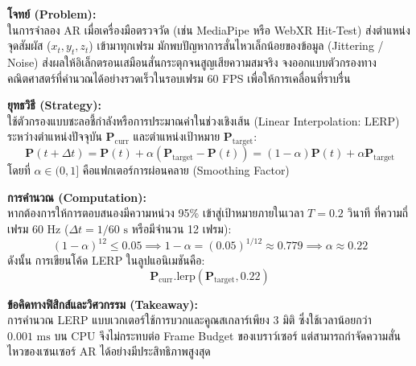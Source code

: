 \begin{psctexample}
\textbf{โจทย์ (Problem):} \\
ในการจำลอง AR เมื่อเครื่องมือตรวจวัด (เช่น MediaPipe หรือ WebXR Hit-Test) ส่งตำแหน่งจุดสัมผัส ($x_t, y_t, z_t$) เข้ามาทุกเฟรม มักพบปัญหาการสั่นไหวเล็กน้อยของข้อมูล (Jittering / Noise) ส่งผลให้อิเล็กตรอนเสมือนสั่นกระตุกจนสูญเสียความสมจริง จงออกแบบตัวกรองทางคณิตศาสตร์ที่คำนวณได้อย่างรวดเร็วในรอบเฟรม 60 FPS เพื่อให้การเคลื่อนที่ราบรื่น

\textbf{ยุทธวิธี (Strategy):} \\
ใช้ตัวกรองแบบชะลอชี้กำลังหรือการประมาณค่าในช่วงเชิงเส้น (Linear Interpolation: LERP) ระหว่างตำแหน่งปัจจุบัน $\mathbf{P}_{\text{curr}}$ และตำแหน่งเป้าหมาย $\mathbf{P}_{\text{target}}$:
\begin{equation}
\mathbf{P}(t + \Delta t) = \mathbf{P}(t) + \alpha \left( \mathbf{P}_{\text{target}} - \mathbf{P}(t) \right) = (1 - \alpha)\mathbf{P}(t) + \alpha \mathbf{P}_{\text{target}}
\end{equation}
โดยที่ $\alpha \in (0, 1]$ คือแฟกเตอร์การผ่อนคลาย (Smoothing Factor)

\textbf{การคำนวณ (Computation):} \\
หากต้องการให้การตอบสนองมีความหน่วง 95\% เข้าสู่เป้าหมายภายในเวลา $T = 0.2\text{ วินาที}$ ที่ความถี่เฟรม $60\text{ Hz}$ ($\Delta t = 1/60\text{ s}$ หรือมีจำนวน 12 เฟรม):
\begin{equation}
(1 - \alpha)^{12} \le 0.05 \implies 1 - \alpha = (0.05)^{1/12} \approx 0.779 \implies \alpha \approx 0.22
\end{equation}
ดังนั้น การเขียนโค้ด LERP ในลูปแอนิเมชันคือ:
\begin{equation}
\mathbf{P}_{\text{curr}}.\text{lerp}(\mathbf{P}_{\text{target}}, 0.22)
\end{equation}

\textbf{ข้อคิดทางฟิสิกส์และวิศวกรรม (Takeaway):} \\
การคำนวณ LERP แบบเวกเตอร์ใช้การบวกและคูณสเกลาร์เพียง 3 มิติ ซึ่งใช้เวลาน้อยกว่า $0.001\text{ ms}$ บน CPU จึงไม่กระทบต่อ Frame Budget ของเบราว์เซอร์ แต่สามารถกำจัดความสั่นไหวของเซนเซอร์ AR ได้อย่างมีประสิทธิภาพสูงสุด
\qedexam
\end{psctexample}

